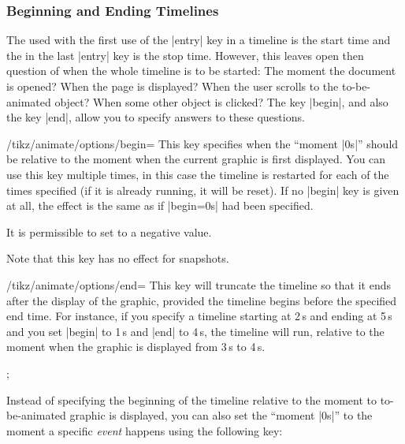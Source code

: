 \subsubsection{Beginning and Ending Timelines}

\label{section-anim-begin-end}

The  used with the first use of the |entry| key in a
timeline is the start time and the  in the last |entry| key
is the stop time. However, this leaves open then question of when the whole
timeline is to be started: The moment the document is opened? When the
page is displayed? When the user scrolls to the to-be-animated object?
When some other object is clicked? The key |begin|, and also the key
|end|, allow you to specify answers to these questions.

\begin{key}{/tikz/animate/options/begin=}
  This key specifies when the ``moment |0s|'' should be relative to
  the moment when the current graphic is first displayed. You can use
  this key multiple times, in this case the timeline is restarted for
  each of the times specified (if it is already running, it will be
  reset). If no |begin| key is given at all, the effect is the same as
  if |begin=0s| had been specified.

  It is permissible to set  to a negative value.

  Note that this key has no effect for snapshots.
\end{key}

\begin{key}{/tikz/animate/options/end=}
  This key will truncate the timeline so that it ends 
  after the display of the graphic, provided the timeline begins
  before the specified end time. For instance, if you specify a
  timeline starting at 2\,s and ending at 5\,s and you set |begin| to
  1\,s and |end| to 4\,s, the timeline will run, relative to the moment
  when the graphic is displayed from 3\,s to 4\,s.

\begin{codeexample}[]
\tikz {};
\end{codeexample}
\end{key}

Instead of specifying the beginning of the timeline relative to the
moment to to-be-animated graphic is displayed, you can also set the
``moment |0s|'' to the moment a specific \emph{event} happens using
the following key:

